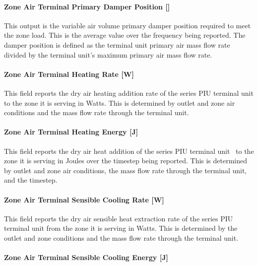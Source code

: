 \paragraph{Zone Air Terminal Primary Damper Position {[]}}\label{zone-air-terminal-series-piu-primary-damper-position}

This output is the variable air volume primary damper position required to meet the zone load. This is the average value over the frequency being reported. The damper position is defined as the terminal unit primary air mass flow rate divided by the terminal unit's maximum primary air mass flow rate.

\paragraph{Zone Air Terminal Heating Rate {[}W{]}}\label{zone-air-terminal-heating-rate-w}

This field reports the dry air heating addition rate of the series PIU terminal unit to the zone it is serving in Watts. This is determined by outlet and zone air conditions and the mass flow rate through the terminal unit.

\paragraph{Zone Air Terminal Heating Energy {[}J{]}}\label{zone-air-terminal-heating-energy-j}

This field reports the dry air heat addition of the series PIU terminal unit~ to the zone it is serving in Joules over the timestep being reported. This is determined by outlet and zone air conditions, the mass flow rate through the terminal unit, and the timestep.

\paragraph{Zone Air Terminal Sensible Cooling Rate {[}W{]}}\label{zone-air-terminal-sensible-cooling-rate-w-1}

This field reports the dry air sensible heat extraction rate of the series PIU terminal unit from the zone it is serving in Watts. This is determined by the outlet and zone conditions and the mass flow rate through the terminal unit.

\paragraph{Zone Air Terminal Sensible Cooling Energy {[}J{]}}\label{zone-air-terminal-sensible-cooling-energy-j-1}


